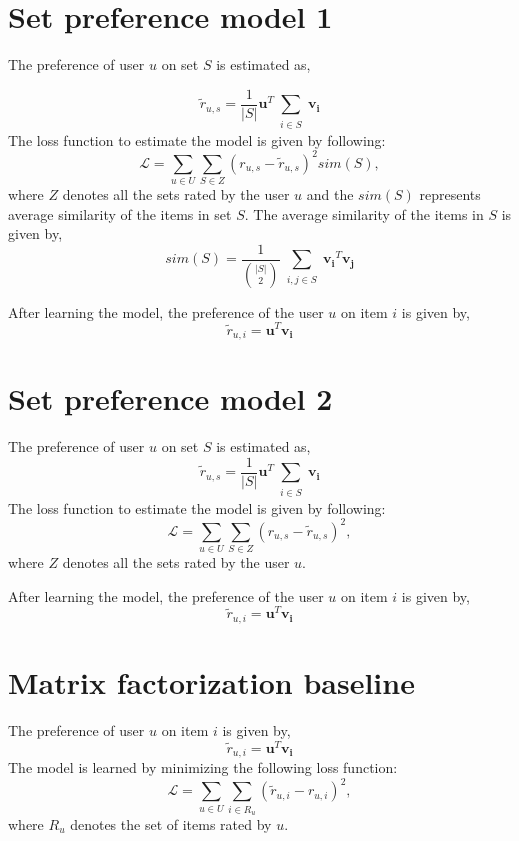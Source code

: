 \documentclass[11pt]{article}
\begin{document}
\section{Set preference model 1}

The preference of user $u$ on set $S$ is estimated as,

%
\begin{equation*}
  \tilde{r}_{u,s} = \frac{1}{|S|} \bm{u}^T \sum_{\substack{i \in S}}\bm{v_i} 
\end{equation*}
%
The loss function to estimate the model is given by following:
\begin{equation*}
  \mathcal{L} = \sum_{u \in U} \sum_{S \in Z} (r_{u,s} - \tilde{r}_{u,s})^2 sim(S),  
\end{equation*}
where $Z$ denotes all the sets rated by the user $u$ and the $sim(S)$ represents
average similarity of the items in set $S$. The average similarity of the
items in $S$ is given by,
%
\begin{equation*}
sim(S) = \frac{1}{\binom{|S|}{2}} \sum_{\substack{i,j \in S}} \bm{v_i}^T\bm{v_j}
\end{equation*}
%

After learning the model, the preference of the user $u$ on item $i$ is given
by,
%
\begin{equation*}
  \tilde{r}_{u,i} = \bm{u}^T \bm{v_i}
\end{equation*}
%


\section{Set preference model 2}
The preference of user $u$ on set $S$ is estimated as,
%
\begin{equation*}
  \tilde{r}_{u,s} = \frac{1}{|S|} \bm{u}^T \sum_{\substack{i \in S}}\bm{v_i} 
\end{equation*}
%
The loss function to estimate the model is given by following:
\begin{equation*}
  \mathcal{L} = \sum_{u \in U} \sum_{S \in Z} (r_{u,s} - \tilde{r}_{u,s})^2,  
\end{equation*}
where $Z$ denotes all the sets rated by the user $u$.

After learning the model, the preference of the user $u$ on item $i$ is given
by,
%
\begin{equation*}
  \tilde{r}_{u,i} = \bm{u}^T \bm{v_i}
\end{equation*}
%
\section{Matrix factorization baseline}
The preference of user $u$ on item $i$ is given by,
%
\begin{equation*}
  \tilde{r}_{u,i} = \bm{u}^T \bm{v_i}
\end{equation*}
%
The model is learned by minimizing the following loss function:
\begin{equation*}
  \mathcal{L} = \sum_{u \in U} \sum_{i \in R_u}(\tilde{r}_{u,i} - r_{u,i})^2,
\end{equation*}
where $R_u$ denotes the set of items rated by $u$.
\end{document}
